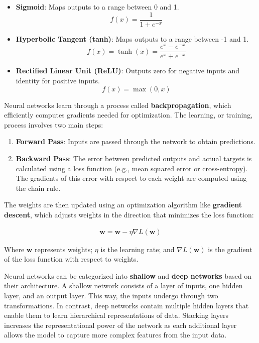 \begin{itemize}
    \item \textbf{Sigmoid}: Maps outputs to a range between 0 and 1.
    \[
    f(x) = \frac{1}{1 + e^{-x}}
    \]
    
    \item \textbf{Hyperbolic Tangent (tanh)}: Maps outputs to a range between -1 and 1.
    \[
    f(x) = \tanh(x) = \frac{e^x - e^{-x}}{e^x + e^{-x}}
    \]
    
    \item \textbf{Rectified Linear Unit (ReLU)}: Outputs zero for negative inputs and identity for positive inputs.
    \[
    f(x) = \max(0, x)
    \]
\end{itemize}

Neural networks learn through a process called \textbf{backpropagation}, which efficiently computes gradients needed for optimization. The learning, or training, process involves two main steps: 

\begin{enumerate}
    \item \textbf{Forward Pass}: Inputs are passed through the network to obtain predictions.
    \item \textbf{Backward Pass}: The error between predicted outputs and actual targets is calculated using a loss function (e.g., mean squared error or cross-entropy). The gradients of this error with respect to each weight are computed using the chain rule.
\end{enumerate}

The weights are then updated using an optimization algorithm like \textbf{gradient descent}, which adjusts weights in the direction that minimizes the loss function:

\begin{align}
  \mathbf{w} = \mathbf{w} - \eta \nabla L(\mathbf{w})  
\end{align}

Where \(\mathbf{w}\) represents weights; \(\eta\) is the learning rate; and \(\nabla L(\mathbf{w})\) is the gradient of the loss function with respect to weights.

Neural networks can be categorized into \textbf{shallow} and \textbf{deep networks} based on their architecture. A shallow network consists of a layer of inputs, one hidden layer, and an output layer. This way, the inputs undergo through two transformations. In contrast, deep networks contain multiple hidden layers that enable them to learn hierarchical representations of data. Stacking layers increases the representational power of the network as each additional layer allows the model to capture more complex features from the input data.

